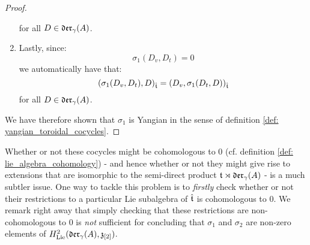 \begin{proof}
\begin{enumerate}
                    for all $D \in \mathfrak{der}_{\gamma}(A)$.
                    \item Lastly, since:
                        $$\sigma_1(D_v, D_t) = 0$$
                    we automatically have that:
                        $$( \sigma_1(D_v, D_t), D )_{\hat{\mathfrak{t}}} = ( D_v, \sigma_1(D_t, D) )_{\hat{\mathfrak{t}}}$$
                    for all $D \in \mathfrak{der}_{\gamma}(A)$.
                \end{enumerate}
                We have therefore shown that $\sigma_1$ is Yangian in the sense of definition \ref{def: yangian_toroidal_cocycles}. 
            \end{proof}
        Whether or not these cocycles might be cohomologous to $0$ (cf. definition \ref{def: lie_algebra_cohomology}) - and hence whether or not they might give rise to extensions that are isomorphic to the semi-direct product $\mathfrak{t} \rtimes \mathfrak{der}_{\gamma}(A)$ - is a much subtler issue. One way to tackle this problem is to \textit{firstly} check whether or not their restrictions to a particular Lie subalgebra of $\hat{\mathfrak{t}}$ is cohomologous to $0$. We remark right away that simply checking that these restrictions are non-cohomologous to $0$ is \textit{not} sufficient for concluding that $\sigma_1$ and $\sigma_2$ are non-zero elements of $H^2_{\mathrm{Lie}}(\mathfrak{der}_{\gamma}(A), \mathfrak{z}_{[2]})$.
        
